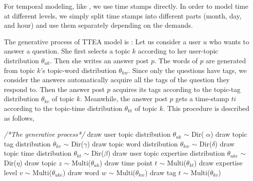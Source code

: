 {{{{{{{For temporal modeling, like \cite{wang2006topics} \cite{hu2014user}, we use time stamps directly. In order to model time at different levels, we simply split time stamps into different parts (month, day, and hour) and use them separately depending on the demands.


The generative process of TTEA model is :
Let us consider a user $u$ who wants to answer a question. She first selects a topic $k$ according to her user-topic distribution $\theta_{uk}$. Then she writes an answer post $p$. The words of $p$ are generated from topic $k$'s topic-word distribution $\theta_{kw}$. Since only the questions have tags, we consider the answers automatically acquire all the tags of the question they respond to. Then the answer post $p$ acquires its tags according to the topic-tag distribution $\theta_{kv}$ of topic $k$. Meanwhile, the answer post $p$ gets a time-stamp $ti$ according to the topic-time distribution $\theta_{kt}$ of topic $k$.
This procedure is described as follows,


\begin{algorithm}%
\begin{algorithmic}[1]
\label{algo:algotopic}
\State \textit{/*The generative process*/}
\State draw user topic distribution $\theta_{uk}$ $\sim$ Dir( $\alpha$) 
\EndFor
{} 
\State draw topic tag distribution $\theta_{kv}$ $\sim$ Dir($\gamma$)
\State draw topic word distribution $\theta_{kw}$ $\sim$ Dir($\delta$)
\State draw topic time distribution $\theta_{kt}$ $\sim$ Dir($\beta$)
\EndFor
{}
\State draw user topic expertise distribution $\theta_{uke}$ $\sim$ Dir($\eta$) 
\EndFor
\EndFor
{}
\State draw topic $z$ $\sim$ Multi($\theta_{uk}$)
\State draw time point $t$ $\sim$ Multi($\theta_{kt}$)
\State draw expertise level $v$ $\sim$ Multi($\theta_{uke}$) 
\State draw word $w$ $\sim$ Multi($\theta_{kw}$) 
\EndFor
{} 
\State draw tag $t$ $\sim$ Multi($\theta_{kv}$)
\EndFor
\EndFor
\end{algorithmic}
\end{algorithm}

}}}}}}}
